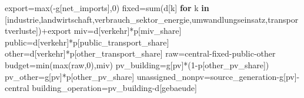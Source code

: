 \documentclass[
  ngerman,
  a4paper,
  DIV=11]{scrreprt}
\newenvironment{Shaded}{\begin{snugshade}}{\end{snugshade}}
\newcommand{\BuiltInTok}[1]{\textcolor[rgb]{0.00,0.23,0.31}{#1}}
\newcommand{\ControlFlowTok}[1]{\textcolor[rgb]{0.00,0.23,0.31}{\textbf{#1}}}
\newcommand{\DecValTok}[1]{\textcolor[rgb]{0.68,0.00,0.00}{#1}}
\newcommand{\KeywordTok}[1]{\textcolor[rgb]{0.00,0.23,0.31}{\textbf{#1}}}
\newcommand{\NormalTok}[1]{\textcolor[rgb]{0.00,0.23,0.31}{#1}}
\newcommand{\OperatorTok}[1]{\textcolor[rgb]{0.37,0.37,0.37}{#1}}
\newcommand{\StringTok}[1]{\textcolor[rgb]{0.13,0.47,0.30}{#1}}
\begin{document}
\begin{Shaded}
\begin{Highlighting}[]
\NormalTok{    export}\OperatorTok{=}\BuiltInTok{max}\NormalTok{(}\OperatorTok{{-}}\NormalTok{g[}\StringTok{\textquotesingle{}net\_imports\textquotesingle{}}\NormalTok{],}\DecValTok{0}\NormalTok{)}
\NormalTok{    fixed}\OperatorTok{=}\BuiltInTok{sum}\NormalTok{(d[k] }\ControlFlowTok{for}\NormalTok{ k }\KeywordTok{in}\NormalTok{ [}\StringTok{\textquotesingle{}industrie\textquotesingle{}}\NormalTok{,}\StringTok{\textquotesingle{}landwirtschaft\textquotesingle{}}\NormalTok{,}\StringTok{\textquotesingle{}verbrauch\_sektor\_energie\textquotesingle{}}\NormalTok{,}\StringTok{\textquotesingle{}umwandlungseinsatz\textquotesingle{}}\NormalTok{,}\StringTok{\textquotesingle{}transportverluste\textquotesingle{}}\NormalTok{])}\OperatorTok{+}\NormalTok{export}
\NormalTok{    miv}\OperatorTok{=}\NormalTok{d[}\StringTok{\textquotesingle{}verkehr\textquotesingle{}}\NormalTok{]}\OperatorTok{*}\NormalTok{p[}\StringTok{\textquotesingle{}miv\_share\textquotesingle{}}\NormalTok{]}
\NormalTok{    public}\OperatorTok{=}\NormalTok{d[}\StringTok{\textquotesingle{}verkehr\textquotesingle{}}\NormalTok{]}\OperatorTok{*}\NormalTok{p[}\StringTok{\textquotesingle{}public\_transport\_share\textquotesingle{}}\NormalTok{]}
\NormalTok{    other}\OperatorTok{=}\NormalTok{d[}\StringTok{\textquotesingle{}verkehr\textquotesingle{}}\NormalTok{]}\OperatorTok{*}\NormalTok{p[}\StringTok{\textquotesingle{}other\_transport\_share\textquotesingle{}}\NormalTok{]}
\NormalTok{    raw}\OperatorTok{=}\NormalTok{central}\OperatorTok{{-}}\NormalTok{fixed}\OperatorTok{{-}}\NormalTok{public}\OperatorTok{{-}}\NormalTok{other}
\NormalTok{    budget}\OperatorTok{=}\BuiltInTok{min}\NormalTok{(}\BuiltInTok{max}\NormalTok{(raw,}\DecValTok{0}\NormalTok{),miv)}
\NormalTok{    pv\_building}\OperatorTok{=}\NormalTok{g[}\StringTok{\textquotesingle{}pv\textquotesingle{}}\NormalTok{]}\OperatorTok{*}\NormalTok{(}\DecValTok{1}\OperatorTok{{-}}\NormalTok{p[}\StringTok{\textquotesingle{}other\_pv\_share\textquotesingle{}}\NormalTok{])}
\NormalTok{    pv\_other}\OperatorTok{=}\NormalTok{g[}\StringTok{\textquotesingle{}pv\textquotesingle{}}\NormalTok{]}\OperatorTok{*}\NormalTok{p[}\StringTok{\textquotesingle{}other\_pv\_share\textquotesingle{}}\NormalTok{]}
\NormalTok{    unassigned\_nonpv}\OperatorTok{=}\NormalTok{source\_generation}\OperatorTok{{-}}\NormalTok{g[}\StringTok{\textquotesingle{}pv\textquotesingle{}}\NormalTok{]}\OperatorTok{{-}}\NormalTok{central}
\NormalTok{    building\_operation}\OperatorTok{=}\NormalTok{pv\_building}\OperatorTok{{-}}\NormalTok{d[}\StringTok{\textquotesingle{}gebaeude\textquotesingle{}}\NormalTok{]}

\end{Highlighting}
\end{Shaded}
\end{document}
